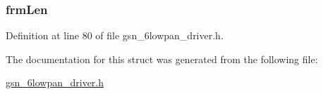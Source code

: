 \hypertarget{a00021_a8c39fe07938dd92f46a8d5b149780e81}{
\subsubsection[{frmLen}]{ {\bf frmLen}}}
\label{a00021_a8c39fe07938dd92f46a8d5b149780e81}


Definition at line 80 of file gsn\_\-6lowpan\_\-driver.h.



The documentation for this struct was generated from the following file:\begin{DoxyCompactItemize}
\item 
\hyperlink{a00472}{gsn\_\-6lowpan\_\-driver.h}\end{DoxyCompactItemize}
